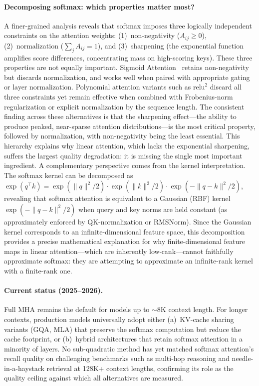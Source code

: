 \paragraph{Decomposing softmax: which properties matter most?}
A finer-grained analysis reveals that softmax imposes three logically independent constraints on the attention weights: (1)~non-negativity ($A_{ij} \geq 0$), (2)~normalization ($\sum_j A_{ij} = 1$), and (3)~sharpening (the exponential function amplifies score differences, concentrating mass on high-scoring keys). These three properties are not equally important. Sigmoid Attention~\cite{ramapuram2024sigmoid} retains non-negativity but discards normalization, and works well when paired with appropriate gating or layer normalization. Polynomial attention variants such as $\mathrm{relu}^2$ discard all three constraints yet remain effective when combined with Frobenius-norm regularization or explicit normalization by the sequence length. The consistent finding across these alternatives is that the sharpening effect---the ability to produce peaked, near-sparse attention distributions---is the most critical property, followed by normalization, with non-negativity being the least essential. This hierarchy explains why linear attention, which lacks the exponential sharpening, suffers the largest quality degradation: it is missing the single most important ingredient.
A complementary perspective comes from the kernel interpretation. The softmax kernel can be decomposed as $\exp(q^\top k) = \exp(\|q\|^2/2) \cdot \exp(\|k\|^2/2) \cdot \exp(-\|q - k\|^2/2)$, revealing that softmax attention is equivalent to a Gaussian (RBF) kernel $\exp(-\|q - k\|^2/2)$ when query and key norms are held constant (as approximately enforced by QK-normalization or RMSNorm). Since the Gaussian kernel corresponds to an infinite-dimensional feature space, this decomposition provides a precise mathematical explanation for why finite-dimensional feature maps in linear attention---which are inherently low-rank---cannot faithfully approximate softmax: they are attempting to approximate an infinite-rank kernel with a finite-rank one.

\paragraph{Current status (2025--2026).}
Full MHA remains the default for models up to $\sim$8K context length. For longer contexts, production models universally adopt either (a)~KV-cache sharing variants (GQA, MLA) that preserve the softmax computation but reduce the cache footprint, or (b)~hybrid architectures that retain softmax attention in a minority of layers. No sub-quadratic method has yet matched softmax attention's recall quality on challenging benchmarks such as multi-hop reasoning and needle-in-a-haystack retrieval at 128K+ context lengths, confirming its role as the quality ceiling against which all alternatives are measured.


